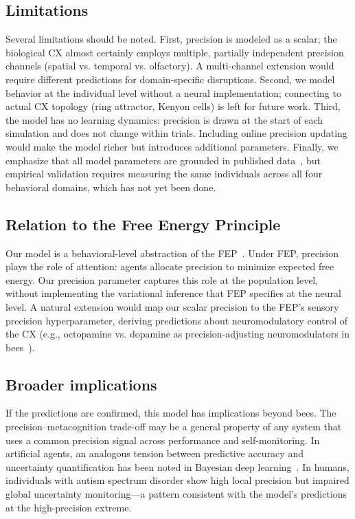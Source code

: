 \subsection*{Limitations}
\label{sec:disc:limits}

Several limitations should be noted. First, precision is modeled as a scalar; the biological CX
almost certainly employs multiple, partially independent precision channels (spatial vs. temporal
vs. olfactory). A multi-channel extension would require different predictions for domain-specific
disruptions. Second, we model behavior at the individual level without a neural implementation;
connecting to actual CX topology (ring attractor, Kenyon cells) is left for future work. Third,
the model has no learning dynamics: precision is drawn at the start of each simulation and does
not change within trials. Including online precision updating would make the model richer but
introduces additional parameters. Finally, we emphasize that all model parameters are grounded in
published data~\cite{AvarWeber2012}, but empirical validation requires measuring the same
individuals across all four behavioral domains, which has not yet been done.

\subsection*{Relation to the Free Energy Principle}
\label{sec:disc:fep}

Our model is a behavioral-level abstraction of the FEP~\cite{Friston2010}. Under FEP, precision
plays the role of attention: agents allocate precision to minimize expected free energy. Our
precision parameter captures this role at the population level, without implementing the
variational inference that FEP specifies at the neural level. A natural extension would map our
scalar precision to the FEP's sensory precision hyperparameter, deriving predictions about
neuromodulatory control of the CX (e.g., octopamine vs. dopamine as precision-adjusting
neuromodulators in bees~\cite{Perry2013}).

\subsection*{Broader implications}
\label{sec:disc:broader}

If the predictions are confirmed, this model has implications beyond bees. The precision--metacognition
trade-off may be a general property of any system that uses a common precision signal across
performance and self-monitoring. In artificial agents, an analogous tension between predictive
accuracy and uncertainty quantification has been noted in Bayesian deep learning~\cite{Clark2013}.
In humans, individuals with autism spectrum disorder show high local precision but impaired global
uncertainty monitoring---a pattern consistent with the model's predictions at the high-precision
extreme.
